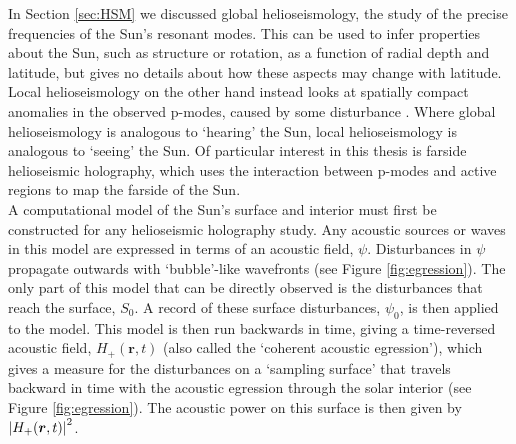 \documentclass[11pt,a4paper,onecolumn]{report}
\DeclarePairedDelimiter{\abs}{\lvert}{\rvert}
\begin{document}
In Section \ref{sec:HSM} we discussed global helioseismology, the
study of the precise frequencies of the Sun's resonant modes. This can be used
to infer properties about the Sun, such as structure or rotation, as a function
of radial depth and latitude, but gives no details about how these aspects may
change with latitude. Local helioseismology on the other hand instead looks at
spatially compact anomalies in the observed p-modes, caused by some disturbance
\citep{braun_absorption_1988}. Where global helioseismology is analogous to
`hearing' the Sun, local helioseismology is analogous to `seeing' the Sun. Of
particular interest in this thesis is farside helioseismic holography, which
uses the interaction between p-modes and active regions to map the farside of
the Sun. \\




A computational model of the Sun's surface and interior must first be constructed for
any helioseismic holography study. Any acoustic sources or waves in this model
are expressed in terms of an acoustic field, \(\psi\). Disturbances in \(\psi\)
propagate outwards with `bubble'-like wavefronts (see Figure
\ref{fig:egression}). The only part of this model that can be directly observed
is the disturbances that reach the surface, \(S_0\). A record of these surface
disturbances, \(\psi_0\), is then applied to the model. This model is then run
backwards in time, giving a time-reversed acoustic field, \(H_+(\bm{r}, t)\)
(also called the `coherent acoustic egression'), which gives a measure for the
disturbances on a `sampling surface' that travels backward in time with the
acoustic egression through the solar interior (see Figure \ref{fig:egression}).
The acoustic power on this surface is then given by \(\abs*{H_+(\bm{r},
t)}^2\).\\
\end{document}
